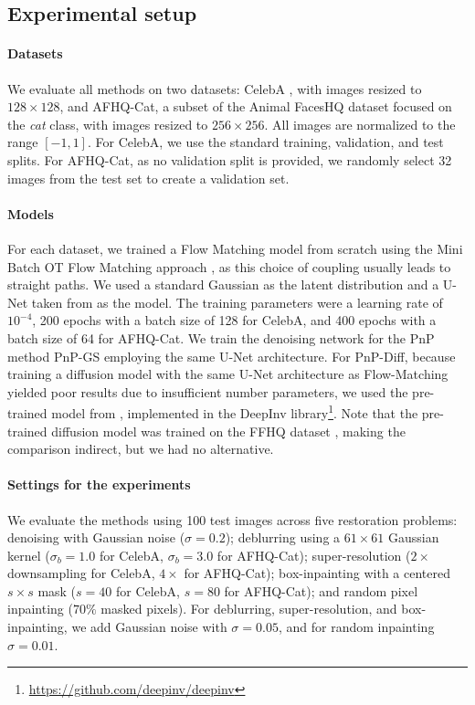 \documentclass{article} %
\theoremstyle{definition}
\begin{document}
\subsection{Experimental setup}

\paragraph{Datasets}
We evaluate all methods on two datasets: CelebA \citep{yang2015facial}, with images resized to $128 \times 128$, and AFHQ-Cat, a subset of the Animal FacesHQ dataset \citep{choi2020stargan} focused on the \emph{cat} class, with images resized to $256 \times 256$. All images are normalized to the range $[-1, 1]$. For CelebA, we use the standard training, validation, and test splits. For AFHQ-Cat, as no validation split is provided, we randomly select 32 images from the test set to create a validation set.

\paragraph{Models}
For each dataset, we trained a Flow Matching model from scratch using the Mini Batch OT Flow Matching approach \citep{tong2024improving}, as this choice of coupling usually leads to straight paths. We used a standard Gaussian as the latent distribution and a U-Net \citep{ronneberger2015u} taken from \citet{huang2021, ho2020} as the model. The training parameters were a learning rate of $10^{-4}$, 200 epochs with a batch size of 128 for CelebA, and 400 epochs with a batch size of 64 for AFHQ-Cat. We train the denoising network for the PnP method PnP-GS \citep{hurault2022gradient} employing the same U-Net architecture. For PnP-Diff, 
because training a diffusion model with the same U-Net architecture as Flow-Matching yielded poor results due to insufficient number parameters, we used the pre-trained model from \cite{choi2021ilvr}, implemented in the DeepInv library\footnote{\hyperlink{DeepInv repository}{https://github.com/deepinv/deepinv}}\citep{Tachella_DeepInverse_A_deep_2023}. Note that the pre-trained diffusion model was trained on the FFHQ dataset \citep{karras2019style}, making the comparison indirect, but we had no alternative.



\paragraph{Settings for the experiments}
We evaluate the methods using 100 test images across five restoration problems: denoising with Gaussian noise ($\sigma=0.2$); deblurring using a $61\times 61$ Gaussian kernel ($\sigma_b=1.0$ for CelebA, $\sigma_b=3.0$ for AFHQ-Cat); super-resolution ($2\times$ downsampling for CelebA, $4\times$ for AFHQ-Cat); box-inpainting with a centered $s\times s$ mask ($s=40$ for CelebA, $s=80$ for AFHQ-Cat); and random pixel inpainting  ($70 \%$ masked pixels). For deblurring, super-resolution, and box-inpainting, we add Gaussian noise with $\sigma=0.05$, and for random inpainting $\sigma=0.01$.
\end{document}
